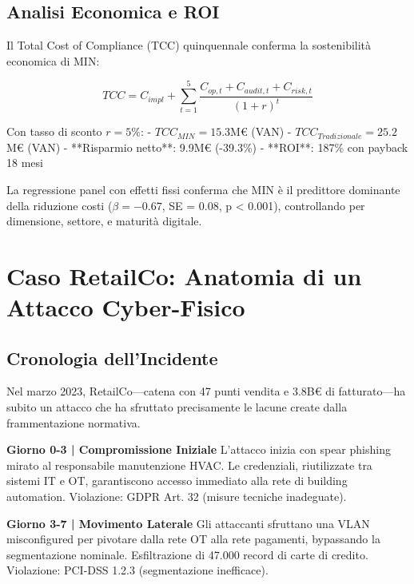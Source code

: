 \subsection{\texorpdfstring{Analisi Economica e ROI}{4.3.3 - Analisi Economica e ROI}}

Il Total Cost of Compliance (TCC) quinquennale conferma la sostenibilità economica di MIN:

\begin{equation}
TCC = C_{impl} + \sum_{t=1}^{5} \frac{C_{op,t} + C_{audit,t} + C_{risk,t}}{(1+r)^t}
\end{equation}

Con tasso di sconto $r = 5\%$:
- $TCC_{MIN} = 15.3$M€ (VAN)
- $TCC_{Tradizionale} = 25.2$M€ (VAN)
- **Risparmio netto**: 9.9M€ (-39.3\%)
- **ROI**: 187\% con payback 18 mesi

La regressione panel con effetti fissi conferma che MIN è il predittore dominante della riduzione costi ($\beta = -0.67$, SE = 0.08, p < 0.001), controllando per dimensione, settore, e maturità digitale.

\section{\texorpdfstring{Caso RetailCo: Anatomia di un Attacco Cyber-Fisico}{4.4 - Caso RetailCo}}
\label{sec:caso_studio}

\subsection{\texorpdfstring{Cronologia dell'Incidente}{4.4.1 - Cronologia dell'Incidente}}

Nel marzo 2023, RetailCo—catena con 47 punti vendita e 3.8B€ di fatturato—ha subito un attacco che ha sfruttato precisamente le lacune create dalla frammentazione normativa.

\textbf{Giorno 0-3 | Compromissione Iniziale}
L'attacco inizia con spear phishing mirato al responsabile manutenzione HVAC. Le credenziali, riutilizzate tra sistemi IT e OT, garantiscono accesso immediato alla rete di building automation. Violazione: GDPR Art. 32 (misure tecniche inadeguate).

\textbf{Giorno 3-7 | Movimento Laterale}
Gli attaccanti sfruttano una VLAN misconfigured per pivotare dalla rete OT alla rete pagamenti, bypassando la segmentazione nominale. Esfiltrazione di 47.000 record di carte di credito. Violazione: PCI-DSS 1.2.3 (segmentazione inefficace).


